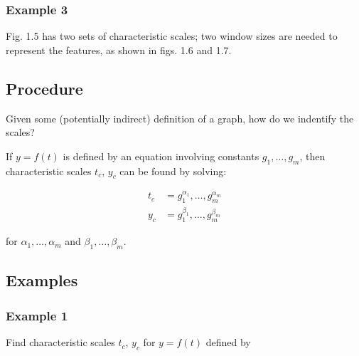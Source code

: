 \documentclass[12pt,twoside]{article}
\begin{document}
\subsubsection{Example 3}

Fig. 1.5 has two sets of characteristic scales; two window sizes are needed to
represent the features, as shown in figs. 1.6 and 1.7.

\subsection{Procedure}
Given some (potentially indirect) definition of a graph, how do we indentify the
scales?

If $y=f(t)$ is defined by an equation involving constants $g_1, \ldots, g_m$,
then characteristic scales $t_c$, $y_c$ can be found by solving:

\begin{equation}
  \begin{aligned}
    t_c &= g_1^{\alpha_1}, \ldots, g_m^{\alpha_m} \\
    y_c &= g_1^{\beta_1}, \ldots, g_m^{\beta_m}
  \end{aligned}
\end{equation}

for $\alpha_1, \ldots, \alpha_m$ and $\beta_1, \ldots, \beta_m$.

\subsection{Examples}
\subsubsection{Example 1}

Find characteristic scales $t_c$, $y_c$ for $y=f(t)$ defined by
\end{document}

